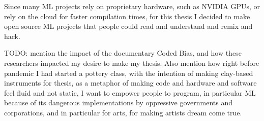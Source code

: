 Since many \acrshort{ML} projects rely on proprietary hardware, such as NVIDIA GPUs, or rely on the cloud for faster compilation times, for this thesis I decided to make open source \acrshort{ML} projects that people could read and understand and remix and hack.

TODO: mention the impact of the documentary Coded Bias, and how these researchers impacted my desire to make my thesis. Also mention how right before pandemic I had started a pottery class, with the intention of making clay-based instruments for thesis, as a metaphor of making code and hardware and software feel fluid and not static, I want to empower people to program, in particular \acrshort{ML} because of its dangerous implementations by oppressive governments and corporations, and in particular for arts, for making artists dream come true.
